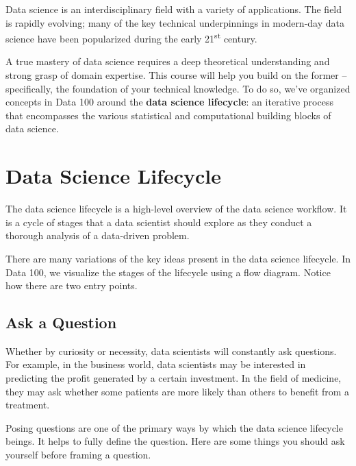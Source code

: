 \documentclass[
  letterpaper,
  DIV=11,
  numbers=noendperiod]{scrreprt}
\begin{document}
Data science is an interdisciplinary field with a variety of
applications. The field is rapidly evolving; many of the key technical
underpinnings in modern-day data science have been popularized during
the early 21\textsuperscript{st} century.

A true mastery of data science requires a deep theoretical understanding
and strong grasp of domain expertise. This course will help you build on
the former -- specifically, the foundation of your technical knowledge.
To do so, we've organized concepts in Data 100 around the \textbf{data
science lifecycle}: an iterative process that encompasses the various
statistical and computational building blocks of data science.

\hypertarget{data-science-lifecycle}{%
\section{Data Science Lifecycle}\label{data-science-lifecycle}}

The data science lifecycle is a high-level overview of the data science
workflow. It is a cycle of stages that a data scientist should explore
as they conduct a thorough analysis of a data-driven problem.

There are many variations of the key ideas present in the data science
lifecycle. In Data 100, we visualize the stages of the lifecycle using a
flow diagram. Notice how there are two entry points.

\hypertarget{ask-a-question}{%
\subsection{Ask a Question}\label{ask-a-question}}

Whether by curiosity or necessity, data scientists will constantly ask
questions. For example, in the business world, data scientists may be
interested in predicting the profit generated by a certain investment.
In the field of medicine, they may ask whether some patients are more
likely than others to benefit from a treatment.

Posing questions are one of the primary ways by which the data science
lifecycle beings. It helps to fully define the question. Here are some
things you should ask yourself before framing a question.
\end{document}
